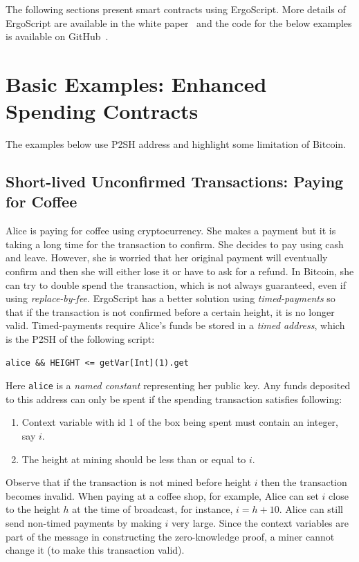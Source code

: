 \documentclass[11pt]{article}
\newcommand{\langname}{ErgoScript\xspace}
\begin{document}
The following sections present smart contracts using \langname. More details of \langname are available in the white paper~\cite{whitepaper} and the code for the below examples is available on GitHub~\cite{langrepo}. 
\section{Basic Examples: Enhanced Spending Contracts}

The examples below use P2SH address and highlight some limitation of Bitcoin. 

\subsection{Short-lived Unconfirmed Transactions: Paying for Coffee}

Alice is paying for coffee using cryptocurrency. She makes a payment but it is taking a long time for the transaction to confirm. She decides to pay using cash and leave. However, she is worried that her original payment will eventually confirm and then she will either lose it or have to ask for a refund. In Bitcoin, she can try to double spend the transaction, which is not always guaranteed, even if using {\em replace-by-fee}. \langname has a better solution using {\em timed-payments} so that if the transaction is not confirmed before a certain height, it is no longer valid. Timed-payments require Alice's funds be stored in a {\em timed address}, which is the P2SH of the following script: 

\begin{verbatim}
alice && HEIGHT <= getVar[Int](1).get
\end{verbatim}

Here \texttt{alice} is a {\em named constant} representing her public key.
Any funds deposited to this address can only be spent if the spending transaction satisfies following:
\begin{enumerate}
	\item Context variable with id 1 of the box being spent must contain an integer, say $i$.
	\item The height at mining should be less than or equal to $i$. 
\end{enumerate}

Observe that if the transaction is not mined before height $i$ then the transaction becomes invalid. When paying at a coffee shop, for example, Alice can set $i$ close to the height $h$ at the time of broadcast, for instance, $i = h + 10$. 
Alice can still send non-timed payments by making $i$ very large. Since the context variables are part of the message in constructing the zero-knowledge proof, a miner cannot change it (to make this transaction valid). 
\end{document}
